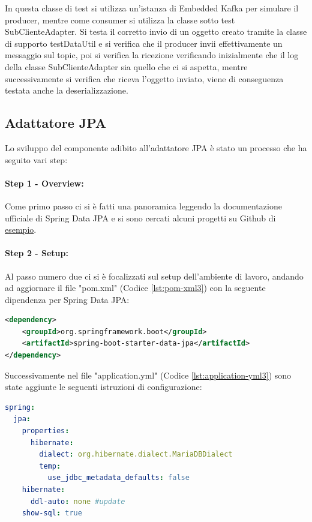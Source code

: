 In questa classe di test si utilizza un’istanza di Embedded Kafka per simulare il producer, mentre come consumer si utilizza la classe sotto test SubClienteAdapter.
Si testa il corretto invio di un oggetto creato tramite la classe di supporto testDataUtil e si verifica che il producer invii effettivamente un messaggio sul topic, poi si verifica la ricezione verificando inizialmente che il log della classe SubClienteAdapter sia quello che ci si aspetta, mentre successivamente si verifica che riceva l’oggetto inviato, viene di conseguenza testata anche la deserializzazione.


\subsection{Adattatore JPA}
Lo sviluppo del componente adibito all'adattatore JPA è stato un processo che ha seguito vari step:
\paragraph{Step 1 - Overview:}
Come primo passo ci si è fatti una panoramica leggendo la documentazione ufficiale di Spring Data JPA \cite{spring-data-jpa} e si sono cercati alcuni progetti su Github di \href{https://github.com/spring-projects/spring-data-examples/}{esempio}.
\paragraph{Step 2 - Setup:}
Al passo numero due ci si è focalizzati sul setup dell’ambiente di lavoro, andando ad aggiornare il file "pom.xml" (Codice \vref{lst:pom-xml3}) con la seguente dipendenza per Spring Data JPA:
\begin{lstlisting}[language=XML, caption={Aggiornamento dipendenze nel pom.xml per includere spring-data-jpa}, label=lst:pom-xml3]
<dependency>
    <groupId>org.springframework.boot</groupId>
    <artifactId>spring-boot-starter-data-jpa</artifactId>
</dependency>
\end{lstlisting}
Successivamente nel file "application.yml" (Codice \vref{lst:application-yml3}) sono state aggiunte le seguenti istruzioni di configurazione:
\begin{lstlisting}[language=yaml, caption={Aggiornamento del file `application.yml` per Spring Data JPA}, label=lst:application-yml3]
spring:
  jpa:
    properties:
      hibernate:
        dialect: org.hibernate.dialect.MariaDBDialect
        temp:
          use_jdbc_metadata_defaults: false
    hibernate:
      ddl-auto: none #update
    show-sql: true
\end{lstlisting}
